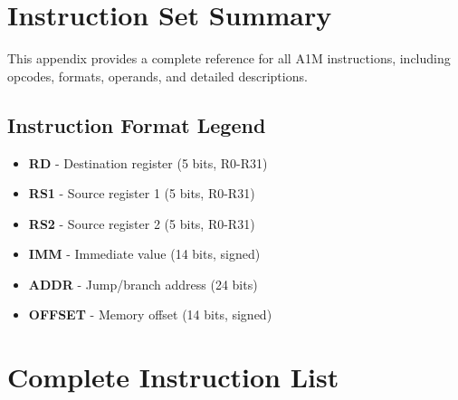 \documentclass[12pt,a4paper,oneside]{book}
\begin{document}
\section{Instruction Set Summary}

This appendix provides a complete reference for all A1M instructions, including opcodes, formats, operands, and detailed descriptions.

\subsection{Instruction Format Legend}

\begin{itemize}
    \item \textbf{RD} - Destination register (5 bits, R0-R31)
    \item \textbf{RS1} - Source register 1 (5 bits, R0-R31)
    \item \textbf{RS2} - Source register 2 (5 bits, R0-R31)
    \item \textbf{IMM} - Immediate value (14 bits, signed)
    \item \textbf{ADDR} - Jump/branch address (24 bits)
    \item \textbf{OFFSET} - Memory offset (14 bits, signed)
\end{itemize}

\section{Complete Instruction List}
\end{document}

